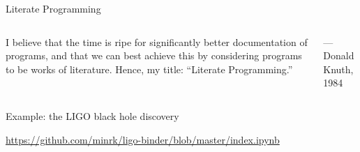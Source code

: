 \documentclass[aspectratio=169]{beamer}
\begin{document}
\begin{frame}{Literate Programming}
\vspace{0.5 cm}
\begin{columns}
I believe that the time is ripe for significantly better documentation of programs, and that we can best achieve this by considering programs to be works of literature. Hence, my title: ``Literate Programming.''

\hfill --- Donald Knuth, 1984

\vspace{1.2 cm}



\vspace{1.2 cm}


\end{columns}
\end{frame}

\begin{frame}{Example: the LIGO black hole discovery}
\vspace{1 cm}
\LARGE

\centering \textcolor{blue}{\url{https://github.com/minrk/ligo-binder/blob/master/index.ipynb}}

\end{frame}
\end{document}
